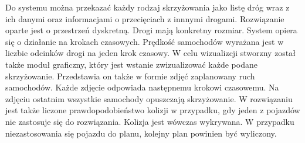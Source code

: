 \newline
\newline
Do systemu można przekazać każdy rodzaj skrzyżowania jako listę dróg wraz z ich danymi oraz informacjami o przecięciach z innnymi drogami.
\newline
\newline
Rozwiązanie oparte jest o przestrzeń dyskretną. Drogi mają konkretny rozmiar. System opiera się o działanie na krokach czasowych. Prędkość samochodów wyrażana jest w liczbie odcinków drogi na jeden krok czasowy.
\newline
\newline
W celu wizualizcji stworzny został także moduł graficzny, który jest wstanie zwizualizować każde podane skrzyżowanie. Przedstawia on także w formie zdjęć zaplanowany ruch samochodów. Każde zdjęcie odpowiada następnemu krokowi czasowemu. Na zdjęciu ostatnim wszystkie samochody opuszczają skrzyżowanie.
\newline
\newline
W rozwiązaniu jest także liczone prawdopodobieństwo kolizji w przypadku, gdy jeden z pojazdów nie zastosuje się do rozwiązania. Kolizja jest wówczas wykrywana. W przypadku niezastosowania się pojazdu do planu, kolejny plan powinien być wyliczony.
